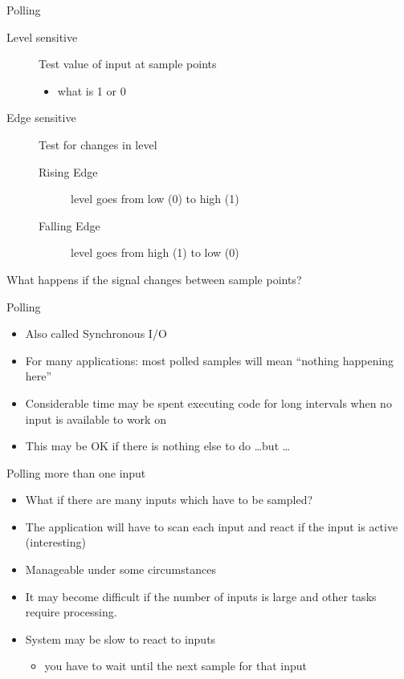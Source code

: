 \documentclass[svgnames,x11names]{beamer}
\begin{document}
\begin{frame}[fragile]{Polling}
  \begin{description}
  \item[Level sensitive] Test value of input at sample points 
    \begin{itemize}
    \item what is 1 or 0
    \end{itemize}
  \item[Edge sensitive] Test for changes in level
    \begin{description}
    \item[Rising Edge] level goes from low (0) to high (1)
    \item[Falling Edge] level goes from high (1) to low (0)
    \end{description}
  \end{description}
  \begin{alertblock}{}
    What happens if the signal changes between sample points?
  \end{alertblock}
\end{frame}

\begin{frame}{Polling}
  \begin{itemize}
  \item Also called \alert{Synchronous} I/O
  \item For many applications:  most polled samples will mean ``nothing happening here''
  \item Considerable time may be spent executing code for long
    intervals when no input is available to work on 
  \item This may be OK if there is nothing else to do \ldots but \ldots
  \end{itemize}
\end{frame}

\begin{frame}{Polling more than one input}
  \begin{itemize}[<+->]
  \item What if there are many inputs which have to be sampled?
  \item The application will have to scan each input and react if the
    input is active (interesting)
  \item Manageable under some circumstances
  \item It may become difficult if the number of inputs is large and
    other tasks require processing.
  \item System may be slow to react to inputs
    \begin{itemize}
    \item you have to wait until the next sample for that input
    \end{itemize}

  \end{itemize}
\end{frame}
\end{document}
